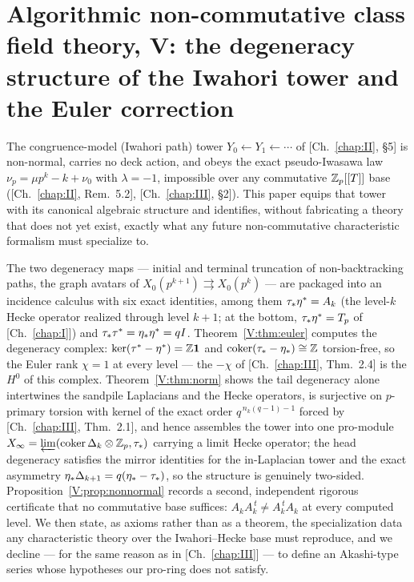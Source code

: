 \chapter[V. The degeneracy structure of the Iwahori tower and the Euler correction]{Algorithmic non-commutative class field theory, V: the degeneracy structure of the Iwahori tower and the Euler correction}\label{chap:V}
\begin{chapterabstract}
The congruence-model (Iwahori path) tower $Y_0\leftarrow Y_1\leftarrow\cdots$ of
[Ch.~\ref{chap:II}, \S5] is non-normal, carries no deck action, and obeys the exact pseudo-Iwasawa
law $\nu_p=\mu p^k-k+\nu_0$ with $\lambda=-1$, impossible over any commutative
$\mathbb{Z}_p[[T]]$ base ([Ch.~\ref{chap:II}, Rem.~5.2], [Ch.~\ref{chap:III}, \S2]). This paper equips that tower with its
canonical algebraic structure and identifies, without fabricating a theory that does
not yet exist, exactly what any future non-commutative characteristic formalism must
specialize to.

The two degeneracy maps --- initial and terminal truncation of non-backtracking paths,
the graph avatars of $X_0(p^{k+1})\rightrightarrows X_0(p^k)$ --- are packaged into an
incidence calculus with six exact identities, among them
$\tau_*\eta^*=A_k$ (the level-$k$ Hecke operator realized through level $k{+}1$; at the
bottom, $\tau_*\eta^*=T_p$ of [Ch.~\ref{chap:I}]) and $\tau_*\tau^*=\eta_*\eta^*=qI$. Theorem~\ref{V:thm:euler}
computes the degeneracy complex: $\ker(\tau^*-\eta^*)=\mathbb{Z}\mathbf1$ and
$\operatorname{coker}(\tau_*-\eta_*)\cong\mathbb{Z}$ torsion-free, so the Euler rank $\chi=1$ at every level ---
the $-\chi$ of [Ch.~\ref{chap:III}, Thm.~2.4] is the $H^0$ of this complex. Theorem~\ref{V:thm:norm}
shows the tail degeneracy alone intertwines the sandpile Laplacians and the Hecke
operators, is surjective on $p$-primary torsion with kernel of the exact order
$q^{\,n_k(q-1)-1}$ forced by [Ch.~\ref{chap:III}, Thm.~2.1], and hence assembles the tower into one
pro-module $X_\infty=\varprojlim(\operatorname{coker}\Delta_k\otimes\mathbb{Z}_p,\tau_*)$ carrying a limit Hecke
operator; the head degeneracy satisfies the mirror identities for the in-Laplacian
tower and the exact asymmetry $\eta_*\Delta_{k+1}=q(\eta_*-\tau_*)$, so the structure is
genuinely two-sided. Proposition~\ref{V:prop:nonnormal} records a second, independent
rigorous certificate that no commutative base suffices: $A_kA_k^{\,t}\neq
A_k^{\,t}A_k$ at every computed level. We then state, as axioms rather than as a
theorem, the specialization data any characteristic theory over the Iwahori--Hecke
base must reproduce, and we decline --- for the same reason as in [Ch.~\ref{chap:III}] --- to define
an Akashi-type series whose hypotheses our pro-ring does not satisfy.
\end{chapterabstract}

